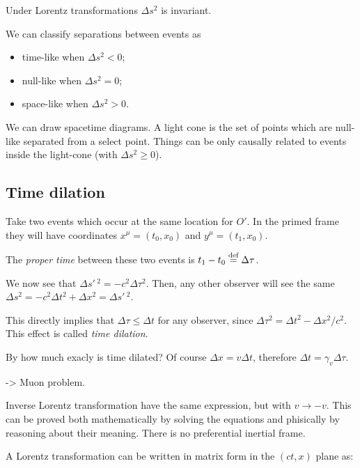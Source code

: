 \documentclass[main.tex]{subfiles}
\begin{document}
\begin{proposition}
Under Lorentz transformations \(\Delta s^2\) is invariant.
\end{proposition}

We can classify separations between events as
%
\begin{itemize}
    \item time-like when \(\Delta s^2 <0\);
    \item null-like when \(\Delta s^2 =0\);
    \item space-like when \(\Delta s^2 >0\).
\end{itemize}

We can draw spacetime diagrams. A light cone is the set of points which are null-like separated from a select point. Things can be only causally related to events inside the light-cone (with \(\Delta s^2 \geq 0\)).

\subsection{Time dilation}

Take two events which occur at the same location for \(O'\). In the primed frame they will have coordinates \(x^{\mu} = (t_0, x_0)\) and \(y^\mu = (t_1, x_0)\).

\begin{definition}
    The \emph{proper time} between these two events is \(t_1 - t_0 \stackrel{\text{def}}{=} \Delta \tau\).
\end{definition}

We now see that \(\Delta s'\,^2 = -c^2 \Delta \tau^2\). Then, any other observer will see the same  \(\Delta s^2 = - c^2 \Delta t^2 + \Delta x^2 = \Delta s'\,^2\).

This directly implies that \(\Delta \tau \leq \Delta t\) for any observer, since \(\Delta \tau^2 = \Delta t^2 - \Delta x^2 / c^2\). This effect is called \emph{time dilation}.

By how much exacly is time dilated? Of course \(\Delta x = v \Delta t\), therefore \(\Delta t = \gamma_v \Delta \tau\).

-> Muon problem.

Inverse Lorentz transformation have the same expression, but with \(v \rightarrow -v\).
This can be proved both mathematically by solving the equations and phisically by reasoning about their meaning. There is no preferential inertial frame.

A Lorentz transformation can be written in matrix form in the \((ct, x)\) plane as:
\end{document}
